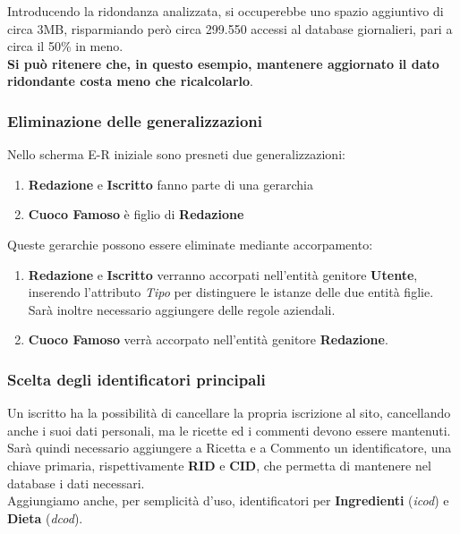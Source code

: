 \documentclass[12pt]{extarticle}
\begin{document}
Introducendo la ridondanza analizzata, si occuperebbe uno spazio aggiuntivo di circa
3MB, risparmiando però circa 299.550 accessi al database giornalieri, pari a circa il 50\% in meno.\\
\textbf{Si può ritenere che, in questo esempio, mantenere aggiornato il dato ridondante costa
meno che ricalcolarlo}.

\newpage


\subsubsection{Eliminazione delle generalizzazioni}

Nello scherma E-R iniziale sono presneti due generalizzazioni:
\begin{enumerate}
    \item \textbf{Redazione} e \textbf{Iscritto} fanno parte di una gerarchia
    \item \textbf{Cuoco Famoso} è figlio di \textbf{Redazione}
\end{enumerate}

Queste gerarchie possono essere eliminate mediante accorpamento:
\begin{enumerate}
    \item \textbf{Redazione} e \textbf{Iscritto} verranno accorpati nell'entità genitore \textbf{Utente}, inserendo l'attributo \textit{Tipo} per distinguere le istanze delle due entità figlie. Sarà inoltre necessario aggiungere delle regole aziendali.
    \item \textbf{Cuoco Famoso} verrà accorpato nell'entità genitore \textbf{Redazione}.
\end{enumerate}

\subsubsection{Scelta degli identificatori principali}

Un iscritto ha la possibilità di cancellare la propria iscrizione al sito, 
cancellando anche i  suoi dati personali, ma le ricette ed i commenti devono essere mantenuti.
Sarà quindi necessario aggiungere a Ricetta e a Commento un identificatore, una chiave primaria,
rispettivamente \textbf{RID} e \textbf{CID}, che permetta di mantenere nel database i dati necessari.
\\
Aggiungiamo anche, per semplicità d'uso, identificatori per \textbf{Ingredienti} (\textit{icod}) e \textbf{Dieta} (\textit{dcod}).
\end{document}
